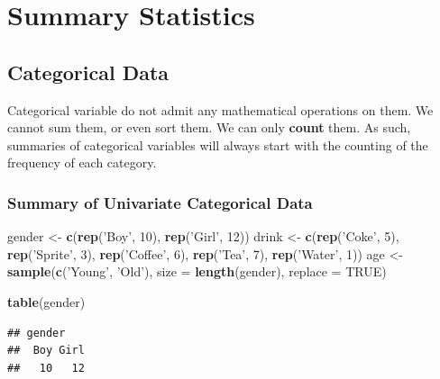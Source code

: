 \documentclass[]{book}
\newenvironment{Shaded}{\begin{snugshade}}{\end{snugshade}}
\newcommand{\KeywordTok}[1]{\textcolor[rgb]{0.13,0.29,0.53}{\textbf{{#1}}}}
\newcommand{\DataTypeTok}[1]{\textcolor[rgb]{0.13,0.29,0.53}{{#1}}}
\newcommand{\DecValTok}[1]{\textcolor[rgb]{0.00,0.00,0.81}{{#1}}}
\newcommand{\StringTok}[1]{\textcolor[rgb]{0.31,0.60,0.02}{{#1}}}
\newcommand{\OtherTok}[1]{\textcolor[rgb]{0.56,0.35,0.01}{{#1}}}
\newcommand{\NormalTok}[1]{{#1}}
\theoremstyle{definition}
\theoremstyle{definition}
\theoremstyle{remark}
\begin{document}
\section{Summary Statistics}\label{summary-statistics}

\subsection{Categorical Data}\label{categorical-data}

Categorical variable do not admit any mathematical operations on them.
We cannot sum them, or even sort them. We can only \textbf{count} them.
As such, summaries of categorical variables will always start with the
counting of the frequency of each category.

\subsubsection{Summary of Univariate Categorical
Data}\label{summary-of-univariate-categorical-data}

\begin{Shaded}
\begin{Highlighting}[]
\NormalTok{gender <-}\StringTok{ }\KeywordTok{c}\NormalTok{(}\KeywordTok{rep}\NormalTok{(}\StringTok{'Boy'}\NormalTok{, }\DecValTok{10}\NormalTok{), }\KeywordTok{rep}\NormalTok{(}\StringTok{'Girl'}\NormalTok{, }\DecValTok{12}\NormalTok{))}
\NormalTok{drink <-}\StringTok{ }\KeywordTok{c}\NormalTok{(}\KeywordTok{rep}\NormalTok{(}\StringTok{'Coke'}\NormalTok{, }\DecValTok{5}\NormalTok{), }\KeywordTok{rep}\NormalTok{(}\StringTok{'Sprite'}\NormalTok{, }\DecValTok{3}\NormalTok{), }\KeywordTok{rep}\NormalTok{(}\StringTok{'Coffee'}\NormalTok{, }\DecValTok{6}\NormalTok{), }\KeywordTok{rep}\NormalTok{(}\StringTok{'Tea'}\NormalTok{, }\DecValTok{7}\NormalTok{), }\KeywordTok{rep}\NormalTok{(}\StringTok{'Water'}\NormalTok{, }\DecValTok{1}\NormalTok{))  }
\NormalTok{age <-}\StringTok{  }\KeywordTok{sample}\NormalTok{(}\KeywordTok{c}\NormalTok{(}\StringTok{'Young'}\NormalTok{, }\StringTok{'Old'}\NormalTok{), }\DataTypeTok{size =} \KeywordTok{length}\NormalTok{(gender), }\DataTypeTok{replace =} \OtherTok{TRUE}\NormalTok{)}

\KeywordTok{table}\NormalTok{(gender)}
\end{Highlighting}
\end{Shaded}

\begin{verbatim}
## gender
##  Boy Girl 
##   10   12
\end{verbatim}
\end{document}
